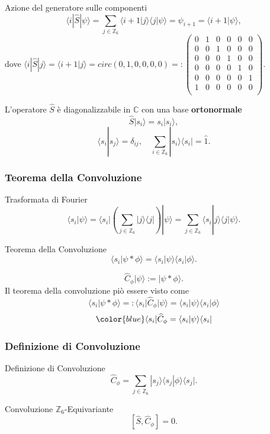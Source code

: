 \documentclass[xcolor=dvipsnames]{beamer}
\newcommand{\C}{\mathbb{C}}
\newcommand{\Z}{\mathbb{Z}}
\begin{document}
\begin{frame}
    \begin{block}{Azione del generatore sulle componenti}
        \[ \langle i | \widehat{S} | \psi \rangle =  \sum_{j \in \Z_6} \langle i+1 | j \rangle \langle j | \psi \rangle = \psi_{i+1} = \langle i+1 | \psi \rangle, \]
        dove $ \langle i | \widehat{S} | j \rangle = \langle i+1 | j \rangle = circ(0,1,0,0,0,0) =: \begin{pmatrix} 0 & 1 & 0 & 0 & 0 & 0 \\ 0 & 0 & 1 & 0 & 0 & 0 \\ 0 & 0 & 0 & 1 & 0 & 0
        \\ 0 & 0 & 0 & 0 & 1 & 0 \\ 0 & 0 & 0 & 0 & 0 & 1 \\ 1 & 0 & 0 & 0 & 0 & 0 \\ 
    \end{pmatrix}$.
    \end{block}  
    L'operatore $\widehat{S}$ è diagonalizzabile in $\C$ con una base \textbf{ortonormale} \[ \widehat{S}|s_i \rangle = s_i | s_i \rangle, \]
    \[ \langle s_i | s_j \rangle = \delta_{ij}, \quad
    \sum_{i \in \Z_6} | s_i \rangle \langle s_i | = \widehat{1} .\]  
\end{frame}

\begin{frame}
    \frametitle{Teorema della Convoluzione}
    \begin{block}{Trasformata di Fourier}
        \[ \langle s_i | \psi \rangle = \langle s_i | \left( \sum_{j \in \Z_6} | j \rangle \langle j| \right) | \psi \rangle = 
        \sum_{j \in \Z_6} \langle s_i| j \rangle \langle j | \psi \rangle. \]
    \end{block}
    \begin{block}{Teorema della Convoluzione}
        \[ \langle s_i | \psi * \phi \rangle = \langle s_i | \psi \rangle \langle s_i | \phi \rangle . \]
    \end{block}
    \[ \widehat{C}_\phi | \psi \rangle  := | \psi * \phi \rangle . \]
    Il teorema della convoluzione piò essere visto come
    \[ \langle s_i | \psi * \phi \rangle =: \langle s_i | \widehat{C}_\phi |\psi \rangle =\langle s_i | \psi \rangle \langle s_i | \phi \rangle \]
   \[ {\color{blue} \langle s_i | \widehat{C}_\phi = \langle s_i | \psi \rangle \langle s_i | }\]
\end{frame}

\begin{frame}
    \frametitle{Definizione di Convoluzione}
    \begin{block}{Definizione di Convoluzione}
        \[\widehat{C}_\phi = \sum_{j \in \Z_6} | s_j \rangle \langle s_j | \phi \rangle \langle s_j |.\]
    \end{block} 
    \begin{block}{Convoluzione $\Z_6$-Equivariante}
        \Large
        \[ [ \widehat{S}, \widehat{C}_\phi] = 0 .\]
    \end{block}
\end{frame}
\end{document}
